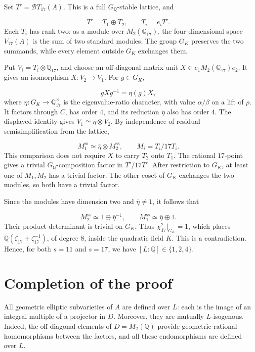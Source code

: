 \documentclass[11pt]{article}
\newcommand{\Q}{\mathbb Q}
\begin{document}
Set \(T'=\mathcal B T_{17}(A)\). This is a full \(G_{\Q}\)-stable lattice, and

\[
T'=T_1\oplus T_2,\qquad T_i=e_iT'.
\]
Each \(T_i\) has rank two: as a module over \(M_2(\Q_{17})\), the four-dimensional space \(V_{17}(A)\) is the sum of two standard modules. The group \(G_K\) preserves the two summands, while every element outside \(G_K\) exchanges them.

Put \(V_i=T_i\otimes\Q_{17}\), and choose an off-diagonal matrix unit \(X\in e_1M_2(\Q_{17})e_2\). It gives an isomorphism \(X:V_2\to V_1\). For \(g\in G_K\),

\[
gXg^{-1}=\eta(g)X,
\]
where \(\eta:G_K\to\Q_{17}^\times\) is the eigenvalue-ratio character, with value \(\alpha/\beta\) on a lift of \(\rho\). It factors through \(C\), has order \(4\), and its reduction \(\overline\eta\) also has order \(4\). The displayed identity gives \(V_1\simeq\eta\otimes V_2\). By independence of residual semisimplification from the lattice,

\[
M_1^{\mathrm{ss}}\simeq\overline\eta\otimes M_2^{\mathrm{ss}},
\qquad M_i=T_i/17T_i.
\]
This comparison does not require \(X\) to carry \(T_2\) onto \(T_1\). The rational \(17\)-point gives a trivial \(G_{\Q}\)-composition factor in \(T'/17T'\). After restriction to \(G_K\), at least one of \(M_1,M_2\) has a trivial factor. The other coset of \(G_K\) exchanges the two modules, so both have a trivial factor.

Since the modules have dimension two and \(\overline\eta\ne1\), it follows that

\[
M_2^{\mathrm{ss}}\simeq1\oplus\overline\eta^{-1},
\qquad M_1^{\mathrm{ss}}\simeq\overline\eta\oplus1.
\]
Their product determinant is trivial on \(G_K\). Thus \(\chi_{17}^2|_{G_K}=1\), which places \(\Q(\zeta_{17}+\zeta_{17}^{-1})\), of degree \(8\), inside the quadratic field \(K\). This is a contradiction. Hence, for both \(s=11\) and \(s=17\), we have \([L:\Q]\in\{1,2,4\}\).


\section{Completion of the proof}\label{sec:completion}
All geometric elliptic subvarieties of \(A\) are defined over \(L\): each is the image of an integral multiple of a projector in \(D\). Moreover, they are mutually \(L\)-isogenous. Indeed, the off-diagonal elements of \(D=M_2(\Q)\) provide geometric rational homomorphisms between the factors, and all these endomorphisms are defined over \(L\).
\end{document}
